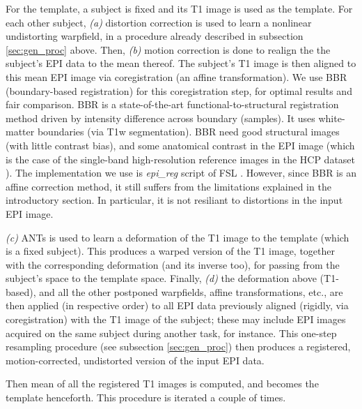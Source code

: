  For the template, a subject is fixed
and its T1 image is used as the template. For each other subject,
\textit{(a)} distortion correction is used to learn a nonlinear
    undistorting warpfield, in a procedure already described in
    subsection \ref{sec:gen_proc} above. Then,
\textit{(b)} motion correction is done to realign the the
subject's EPI data to the mean thereof.
    The subject's T1 image is then aligned to this
    mean EPI image via coregistration (an affine transformation).
We use BBR (boundary-based registration)
    \citep{greve2009accurate} for this coregistration step,
    for optimal results and fair comparison.
    BBR is a state-of-the-art functional-to-structural registration method driven by intensity
    difference across boundary (samples). It uses white-matter boundaries (via T1w segmentation).
    BBR need good structural images
    (with little contrast bias), and some anatomical contrast in the EPI image (which
    is the case of the single-band high-resolution reference images in the HCP dataset
    \citep{VanEssen20122222}). The implementation we use is \textit{epi\_reg} script of FSL
    \citep{smith2004}.
    However, since BBR is an affine correction method, it still suffers from the limitations explained in
    the introductory section. In particular, it is not resiliant to distortions in the input EPI
    image.
    

\textit{(c)} ANTs is used to learn a deformation of the T1
    image to the
    template (which is a fixed subject). This produces a warped
    version of the T1 image, together with the corresponding
    deformation (and its inverse too), for passing from the subject's
    space to the template space. Finally,
\textit{(d)} the deformation above (T1-based), and all the
    other postponed
    warpfields, affine transformations, etc., are then applied (in
    respective order) to all EPI data previously aligned (rigidly, via
    coregistration) with the T1 image of the subject; these may
    include EPI images acquired on the same subject during another task,
    for instance. This one-step resampling procedure (see subsection
    \ref{sec:gen_proc}) then produces a registered, motion-corrected,
    undistorted version of the input EPI data.
\label{sec:classical}

Then mean of all the registered T1 images is computed, and becomes the template henceforth. This procedure is iterated a couple of times.

